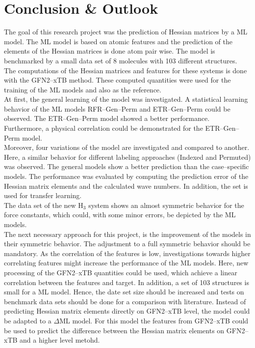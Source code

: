 \chapter{Conclusion \& Outlook}
The goal of this research project was the prediction of Hessian matrices by a ML model.
The ML model is based on atomic features and the prediction of the elements of the Hessian matrices is done atom pair wise.
The model is benchmarked by a small data set of 8 molecules with 103 different structures.
The computations of the Hessian matrices and features for these systems is done with the \mbox{GFN2--xTB} method.
These computed quantities were used for the training of the ML models and also as the reference.\\
At first, the general learning of the model was investigated.
A statistical learning behavior of the ML models \mbox{RFR--Gen--Perm} and \mbox{ETR--Gen--Perm} could be observed.
The \mbox{ETR--Gen--Perm} model showed a better performance.
Furthermore, a physical correlation could be demonstrated for the \mbox{ETR--Gen--Perm} model.\\
Moreover, four variations of the model are investigated and compared to another.
Here, a similar behavior for different labeling approaches (Indexed and Permuted) was observed.
The general models show a better prediction than the case--specific models.
The performance was evaluated by computing the prediction error of the Hessian matrix elements and the calculated wave numbers.
In addition, the set is used for transfer learning.\\
The data set of the new $\mathrm{H}_3$ system shows an almost symmetric behavior for the force constants,
which could, with some minor errors, be depicted by the ML models.\\
The next necessary approach for this project, is the improvement of the models in their symmetric behavior.
The adjustment to a full symmetric behavior should be mandatory.
As the correlation of the features is low,
investigations towards higher correlating features might increase the performance of the ML models.
Here, new processing of the GFN2--xTB quantities could be used, which achieve a linear correlation between the features and target.
In addition, a set of 103 structures is small for a ML model.
Hence, the date set size should be increased and tests on benchmark data sets should be done for a comparison with literature. 
Instead of predicting Hessian matrix elements directly on \mbox{GFN2--xTB} level,
the model could be adapted to a $\Delta$ML model.
For this model the features from \mbox{GFN2--xTB} could be used to predict the difference between the Hessian matrix elements on \mbox{GFN2--xTB} and a higher level metohd.\\
